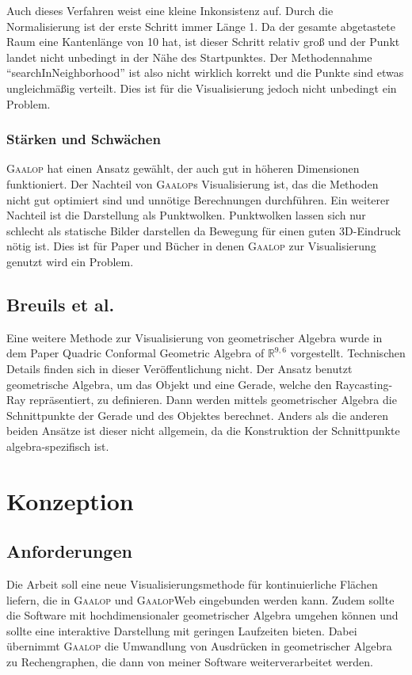 \documentclass[
	ngerman,%
	accentcolor=9c,%
	ruledheaders=section,%
	class=report,%
	thesis={type=bachelor},%
	fontsize=11pt,%
	parskip=half-,%
	custommargins=true,%
	marginpar=false,%
]{tudapub}
\begin{document}
Auch dieses Verfahren weist eine kleine Inkonsistenz auf. Durch die Normalisierung ist der erste Schritt immer Länge 1. Da der gesamte abgetastete Raum eine Kantenlänge von 10 hat, ist dieser Schritt relativ groß und der Punkt landet nicht unbedingt in der Nähe des Startpunktes. Der Methodennahme \enquote{searchInNeighborhood} ist also nicht wirklich korrekt und die Punkte sind etwas ungleichmäßig verteilt. Dies ist für die Visualisierung jedoch nicht unbedingt ein Problem. 
\subsection{Stärken und Schwächen}
\textsc{Gaalop} hat einen Ansatz gewählt, der auch gut in höheren Dimensionen funktioniert. Der Nachteil von \textsc{Gaalop}s Visualisierung ist, das die Methoden nicht gut optimiert sind und unnötige Berechnungen durchführen. Ein weiterer Nachteil ist die Darstellung als Punktwolken.
Punktwolken lassen sich nur schlecht als statische Bilder darstellen da Bewegung für einen guten 3D-Eindruck nötig ist. Dies ist für Paper und Bücher in denen \textsc{Gaalop} zur Visualisierung genutzt wird ein Problem.

\section{Breuils et al.}
Eine weitere Methode zur Visualisierung von geometrischer Algebra wurde in dem Paper Quadric Conformal Geometric Algebra of \(\mathbb{R}^{9,6}\) \cite{breuils2018quadric} vorgestellt. Technischen Details finden sich in dieser Veröffentlichung nicht. Der Ansatz benutzt geometrische Algebra, um das Objekt und eine Gerade, welche den Raycasting-Ray repräsentiert, zu definieren. Dann werden mittels geometrischer Algebra die Schnittpunkte der Gerade und des Objektes berechnet. Anders als die anderen beiden Ansätze ist dieser nicht allgemein, da die Konstruktion der Schnittpunkte algebra-spezifisch ist.

\chapter{Konzeption}

\section{Anforderungen}
Die Arbeit soll eine neue Visualisierungsmethode für kontinuierliche Flächen liefern, die in \textsc{Gaalop} und \textsc{Gaalop}Web eingebunden werden kann. Zudem sollte die Software mit hochdimensionaler geometrischer Algebra umgehen können und sollte eine interaktive Darstellung mit geringen Laufzeiten bieten.
Dabei übernimmt \textsc{Gaalop} die Umwandlung von Ausdrücken in geometrischer Algebra zu Rechengraphen, die dann von meiner Software weiterverarbeitet werden.
\end{document}

